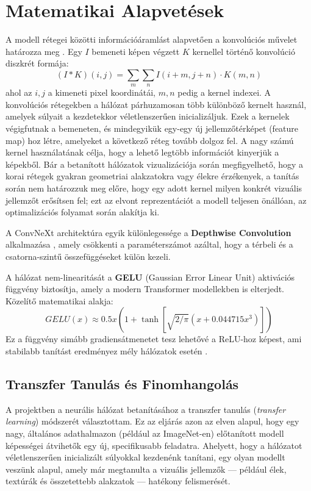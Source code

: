 \documentclass[
	parspace, %
]{elteikthesis}[2024/04/26]
\begin{document}
\section{Matematikai Alapvetések}
A modell rétegei közötti információáramlást alapvetően a konvolúciós művelet határozza meg \cite{hands_on_ml}. Egy $I$ bemeneti képen végzett $K$ kernellel történő konvolúció diszkrét formája:
\begin{equation}
    (I * K)(i, j) = \sum_{m} \sum_{n} I(i+m, j+n) \cdot K(m, n)
\end{equation}
ahol az $i, j$ a kimeneti pixel koordinátái, $m, n$ pedig a kernel indexei. A konvolúciós rétegekben a hálózat párhuzamosan több különböző kernelt használ, amelyek súlyait a kezdetekkor véletlenszerűen inicializáljuk. Ezek a kernelek végigfutnak a bemeneten, és mindegyikük egy-egy új jellemzőtérképet (feature map) hoz létre, amelyeket a következő réteg tovább dolgoz fel. A nagy számú kernel használatának célja, hogy a lehető legtöbb információt kinyerjük a képekből. Bár a betanított hálózatok vizualizációja során megfigyelhető, hogy a korai rétegek gyakran geometriai alakzatokra vagy élekre érzékenyek, a tanítás során nem határozzuk meg előre, hogy egy adott kernel milyen konkrét vizuális jellemzőt erősítsen fel; ezt az elvont reprezentációt a modell teljesen önállóan, az optimalizációs folyamat során alakítja ki.

A ConvNeXt architektúra egyik különlegessége a \textbf{Depthwise Convolution} alkalmazása \cite{convnext_paper}, amely csökkenti a paraméterszámot azáltal, hogy a térbeli és a csatorna-szintű összefüggéseket külön kezeli.

A hálózat nem-linearitását a \textbf{GELU} (Gaussian Error Linear Unit) aktivációs függvény biztosítja, amely a modern Transformer modellekben is elterjedt. Közelítő matematikai alakja:
\begin{equation}
    GELU(x) \approx 0.5x \left( 1 + \tanh \left[ \sqrt{2/\pi} (x + 0.044715x^3) \right] \right)
\end{equation}
Ez a függvény simább gradiensátmenetet tesz lehetővé a ReLU-hoz képest, ami stabilabb tanítást eredményez mély hálózatok esetén \cite{convnext_paper}.

\subsection{Transzfer Tanulás és Finomhangolás}
A projektben a neurális hálózat betanításához a transzfer tanulás (\textit{transfer learning}) módszerét választottam. Ez az eljárás azon az elven alapul, hogy egy nagy, általános adathalmazon (például az ImageNet-en) előtanított modell képességei átvihetők egy új, specifikusabb feladatra. Ahelyett, hogy a hálózatot véletlenszerűen inicializált súlyokkal kezdenénk tanítani, egy olyan modellt veszünk alapul, amely már megtanulta a vizuális jellemzők — például élek, textúrák és összetettebb alakzatok — hatékony felismerését.
\end{document}
